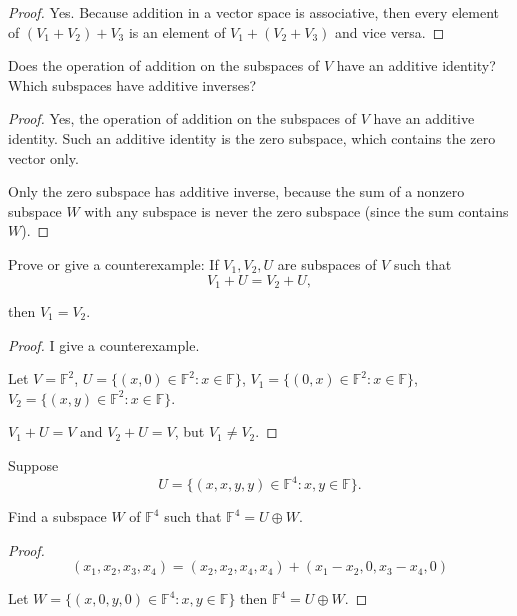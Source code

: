 \begin{proof}
    Yes. Because addition in a vector space is associative, then every element of $(V_{1} + V_{2}) + V_{3}$ is an element of $V_{1} + (V_{2} + V_{3})$ and vice versa.
\end{proof}

\begin{exercise}
    Does the operation of addition on the subspaces of $V$ have an additive identity? Which subspaces have additive inverses?
\end{exercise}

\begin{proof}
    Yes, the operation of addition on the subspaces of $V$ have an additive identity. Such an additive identity is the zero subspace, which contains the zero vector only.

    Only the zero subspace has additive inverse, because the sum of a nonzero subspace $W$ with any subspace is never the zero subspace (since the sum contains $W$).
\end{proof}

\begin{exercise}
    Prove or give a counterexample: If $V_{1}, V_{2}, U$ are subspaces of $V$ such that
    \[
        V_{1} + U = V_{2} + U,
    \]

    then $V_{1} = V_{2}$.
\end{exercise}

\begin{proof}
    I give a counterexample.

    Let $V = \mathbb{F}^{2}$, $U = \{ (x, 0)\in \mathbb{F}^{2}: x\in\mathbb{F} \}$, $V_{1} = \{ (0, x)\in \mathbb{F}^{2}: x\in\mathbb{F} \}$, $V_{2} = \{ (x, y)\in \mathbb{F}^{2}: x\in\mathbb{F} \}$.

    $V_{1} + U = V$ and $V_{2} + U = V$, but $V_{1}\ne V_{2}$.
\end{proof}

\begin{exercise}
    Suppose
    \[
        U = \{ (x, x, y, y)\in\mathbb{F}^{4}: x, y\in\mathbb{F} \}.
    \]

    Find a subspace $W$ of $\mathbb{F}^{4}$ such that $\mathbb{F}^{4} = U\oplus W$.
\end{exercise}

\begin{proof}
    \[
        (x_{1}, x_{2}, x_{3}, x_{4}) = (x_{2}, x_{2}, x_{4}, x_{4}) + (x_{1} - x_{2}, 0, x_{3} - x_{4}, 0)
    \]

    Let $W = \{ (x, 0, y, 0)\in\mathbb{F}^{4}: x, y\in\mathbb{F} \}$ then $\mathbb{F}^{4} = U\oplus W$.
\end{proof}

